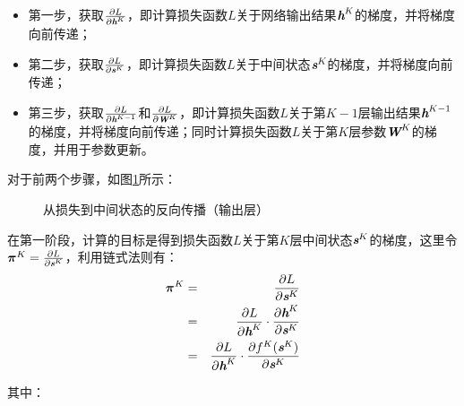 \begin{itemize}
\vspace{0.5em}
\item 第一步，获取$ \frac{\partial L}{\partial {\textbf{\em h}}^K} $，即计算损失函数$ L $关于网络输出结果$ {\textbf{\em h}}^K $的梯度，并将梯度向前传递；
\vspace{0.5em}
\item 第二步，获取$ \frac{\partial L}{\partial {\textbf{\em s}}^K} $，即计算损失函数$ L $关于中间状态$ {\textbf{\em s}}^K $的梯度，并将梯度向前传递；
\vspace{0.5em}
\item 第三步，获取$ \frac{\partial L}{\partial {\textbf{\em h}}^{K-1}} $和$ \frac{\partial L}{\partial{\textbf{\em W}}^K} $，即计算损失函数$ L $关于第$ K-1 $层输出结果$ {\textbf{\em h}}^{K-1} $的梯度，并将梯度向前传递；同时计算损失函数$ L $关于第$K$层参数${\textbf{\em W}}^K $的梯度，并用于参数更新。
\vspace{0.5em}
\end{itemize}

\parinterval  对于前两个步骤，如图\ref{fig:9-54}所示：

\begin{figure}[htp]
\centering

\caption{从损失到中间状态的反向传播（输出层）}
\label{fig:9-54}
\end{figure}

\parinterval  在第一阶段，计算的目标是得到损失函数$ L $关于第$ K $层中间状态$ {\textbf{\em s}}^K $的梯度，这里令$ {\bm \pi}^K= \frac{\partial L}{\partial{\textbf{\em s}}^K} $，利用链式法则有：
\begin{eqnarray}
{\bm \pi}^K&=& \frac{\partial L}{\partial {\textbf{\em s}}^K}\nonumber\\
&=&\frac{\partial L}{\partial {\textbf{\em h}}^K}\cdot \frac{\partial {\textbf{\em h}}^K}{\partial {\textbf{\em s}}^K}\nonumber\\
&=&\frac{\partial L}{\partial {\textbf{\em h}}^K}\cdot \frac{\partial f^K({\textbf{\em s}}^K)}{\partial {\textbf{\em s}}^K}
\label{eq:9-49}
\end{eqnarray}

\noindent  其中：

